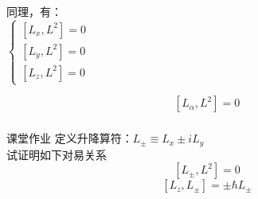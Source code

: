 \begin{frame}     
    同理，有：\\
    $\begin{cases}
        [L_x,L^2]= 0  \\ 
        [L_y,L^2]= 0  \\ 
        [L_z,L^2]= 0 
    \end{cases}$
    \begin{tcolorbox4}[角动量对易关系]
        $$ [L_\alpha,L^2]= 0 $$ 
    \end{tcolorbox4}
\end{frame} 

\begin{frame} [allowframebreaks=]
    \frametitle{}
    \begin{tcolorbox2}{课堂作业}
        定义升降算符：$L_\pm \equiv L_x \pm i L_y$ \\
     试证明如下对易关系  $$[L_\pm,L^2]=0$$
     $$[L_z, L_\pm]= \pm \hbar L_\pm $$
    \end{tcolorbox2}
\end{frame} 
